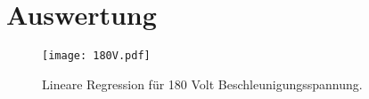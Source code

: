 \section{Auswertung}
\label{sec:Auswertung}

\begin{figure}
  \centering
  \texttt{[image: 180V.pdf]}
  \caption{Lineare Regression für 180 Volt Beschleunigungsspannung.}
  \label{fig:180V}
\end{figure}
